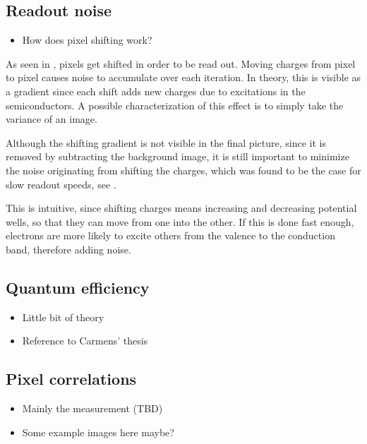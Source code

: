 \newpage
\subsection{Readout noise}
\begin{itemize}
	\item How does pixel shifting work? %
\end{itemize}
As seen in , pixels get shifted in order to be read out. Moving charges from pixel to pixel causes noise to accumulate over each iteration. In theory, this is visible as a gradient since each shift adds new charges due to excitations in the semiconductors. A possible characterization of this effect is to simply take the variance of an image.

Although the shifting gradient is not visible in the final picture, since it is removed by subtracting the background image, it is still important to minimize the noise originating from shifting the charges, which was found to be the case for slow readout speeds, see .


This is intuitive, since shifting charges means increasing and decreasing potential wells, so that they can move from one into the other. If this is done fast enough, electrons are more likely to excite others from the valence to the conduction band, therefore adding noise.

\newpage
\subsection{Quantum efficiency}
\begin{itemize}
	\item Little bit of theory
	\item Reference to Carmens' thesis
\end{itemize}

\subsection{Pixel correlations}
\begin{itemize}
	\item Mainly the measurement (TBD)
	\item Some example images here maybe?
\end{itemize}

